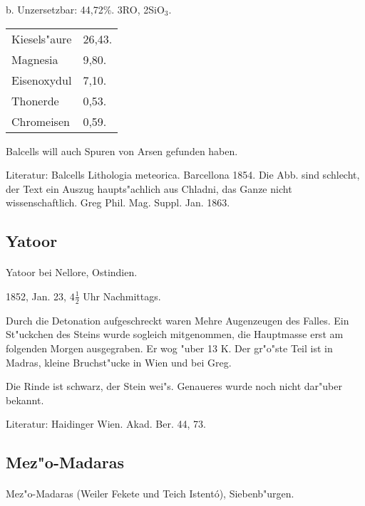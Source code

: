 \documentclass[a4paper, 11pt, oneside]{article}
\begin{document}
\begin{center}
b. Unzersetzbar: 44,72\%. 3RO, 2SiO$_{3}$.
\end{center}

\begin{table}[H]
    \centering
    \begin{tabular}{l l}
    \hline
        Kiesels"aure & 26,43. \\
        Magnesia & 9,80. \\
        Eisenoxydul & 7,10. \\
        Thonerde & 0,53. \\
        Chromeisen & 0,59. \\
    \end{tabular}
\end{table}

Balcells will auch Spuren von Arsen gefunden haben.

\footnotesize
Literatur: Balcells Lithologia meteorica. Barcellona 1854. Die Abb. sind schlecht, der Text ein Auszug haupts"achlich aus Chladni, das Ganze nicht wissenschaftlich. Greg Phil. Mag. Suppl. Jan. 1863.

\subsection{Yatoor}
\normalsize
\paragraph{}
Yatoor bei Nellore, Ostindien.

1852, Jan. 23, $4\frac{1}{2}$ Uhr Nachmittags.

Durch die Detonation aufgeschreckt waren Mehre Augenzeugen des Falles. Ein St"uckchen des Steins wurde sogleich mitgenommen, die Hauptmasse erst am folgenden Morgen ausgegraben. Er wog "uber 13 K. Der gr"o"ste Teil ist in Madras, kleine Bruchst"ucke in Wien und bei Greg.

Die Rinde ist schwarz, der Stein wei"s. Genaueres wurde noch nicht dar"uber bekannt.

\footnotesize
Literatur: Haidinger Wien. Akad. Ber. 44, 73.

\subsection{Mez"o-Madaras}
\normalsize
\paragraph{}
Mez"o-Madaras (Weiler Fekete und Teich Istentó), Siebenb"urgen.
\end{document}

